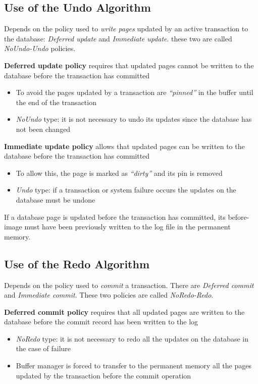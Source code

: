 \subsection{Use of the Undo Algorithm}
Depends on the policy used to \textit{write pages} updated by an active transaction to the database: \textit{Deferred update} and \textit{Immediate update}. these two are called \textit{NoUndo-Undo} policies.

\begin{tcolorbox}
\textbf{Deferred update policy}  requires that updated pages cannot be written to the database before the transaction has committed
\end{tcolorbox}
\begin{itemize}
    \item To avoid the pages updated by a transaction are \textit{“pinned”} in the buffer until the end of the transaction
    \item \textit{NoUndo} type: it is not necessary to undo its updates since the database has not been changed
\end{itemize}


\begin{tcolorbox}
\textbf{Immediate update policy} allows that updated pages can be written to the database before the transaction has committed
\end{tcolorbox}
\begin{itemize}
    \item To allow this, the page is marked as \textit{“dirty”} and its pin is removed
    \item \textit{Undo} type: if a transaction or system failure occurs the updates on the database must be undone
\end{itemize}


\begin{tcolorbox}
If a database page is updated before the transaction has committed, its before-image must have been previously written to the log file in the permanent
memory.
\end{tcolorbox}

\subsection{Use of the Redo Algorithm}
Depends on the policy used to \textit{commit} a transaction. There are \textit{Deferred commit} and \textit{Immediate commit}. These two policies are called \textit{NoRedo-Redo}.

\begin{tcolorbox}
\textbf{Deferred commit policy} requires that all updated pages are written to the database before the commit record has been written to the log
\end{tcolorbox}
\begin{itemize}
    \item \textit{NoRedo} type: it is not necessary to redo all the updates on the database in the case of failure
    \item Buffer manager is forced to transfer to the permanent memory all the pages updated by the transaction before the commit operation
\end{itemize}

